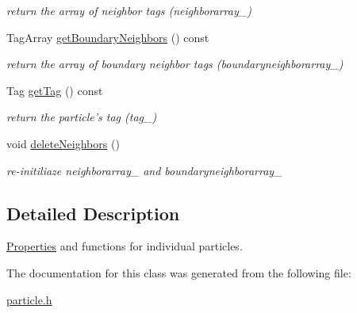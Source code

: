 \begin{DoxyCompactItemize}
\begin{DoxyCompactList}\small\item\em return the array of neighbor tags (neighborarray\-\_\-) \end{DoxyCompactList}\item 
\hypertarget{classParticle_a13ece3496e8e2510d7302d1692b5090d}{\-Tag\-Array \hyperlink{classParticle_a13ece3496e8e2510d7302d1692b5090d}{get\-Boundary\-Neighbors} () const }\label{classParticle_a13ece3496e8e2510d7302d1692b5090d}

\begin{DoxyCompactList}\small\item\em return the array of boundary neighbor tags (boundaryneighborarray\-\_\-) \end{DoxyCompactList}\item 
\hypertarget{classParticle_adce0a40cce7f7862ff2fc0e6bab2e3f4}{\-Tag \hyperlink{classParticle_adce0a40cce7f7862ff2fc0e6bab2e3f4}{get\-Tag} () const }\label{classParticle_adce0a40cce7f7862ff2fc0e6bab2e3f4}

\begin{DoxyCompactList}\small\item\em return the particle's tag (tag\-\_\-) \end{DoxyCompactList}\item 
\hypertarget{classParticle_a54b1e463538ca132ca86c758ca1f04c2}{void \hyperlink{classParticle_a54b1e463538ca132ca86c758ca1f04c2}{delete\-Neighbors} ()}\label{classParticle_a54b1e463538ca132ca86c758ca1f04c2}

\begin{DoxyCompactList}\small\item\em re-\/initiliaze neighborarray\-\_\- and boundaryneighborarray\-\_\- \end{DoxyCompactList}\end{DoxyCompactItemize}


\subsection{\-Detailed \-Description}
\hyperlink{structProperties}{\-Properties} and functions for individual particles. 

\-The documentation for this class was generated from the following file\-:\begin{DoxyCompactItemize}
\item 
\hyperlink{particle_8h}{particle.\-h}\end{DoxyCompactItemize}
